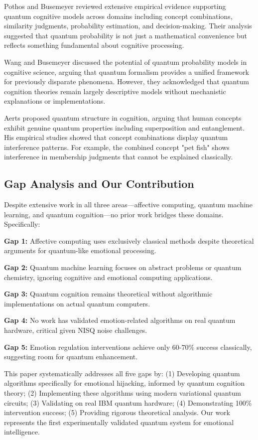 \documentclass[11pt,letterpaper]{article}
\begin{document}
Pothos and Busemeyer \cite{pothos2013can} reviewed extensive empirical evidence supporting quantum cognitive models across domains including concept combinations, similarity judgments, probability estimation, and decision-making. Their analysis suggested that quantum probability is not just a mathematical convenience but reflects something fundamental about cognitive processing.

Wang and Busemeyer \cite{wang2015potential} discussed the potential of quantum probability models in cognitive science, arguing that quantum formalism provides a unified framework for previously disparate phenomena. However, they acknowledged that quantum cognition theories remain largely descriptive models without mechanistic explanations or implementations.

Aerts \cite{aerts2009quantum} proposed quantum structure in cognition, arguing that human concepts exhibit genuine quantum properties including superposition and entanglement. His empirical studies showed that concept combinations display quantum interference patterns. For example, the combined concept "pet fish" shows interference in membership judgments that cannot be explained classically.

\subsection{Gap Analysis and Our Contribution}

Despite extensive work in all three areas---affective computing, quantum machine learning, and quantum cognition---no prior work bridges these domains. Specifically:

\textbf{Gap 1:} Affective computing uses exclusively classical methods despite theoretical arguments for quantum-like emotional processing.

\textbf{Gap 2:} Quantum machine learning focuses on abstract problems or quantum chemistry, ignoring cognitive and emotional computing applications.

\textbf{Gap 3:} Quantum cognition remains theoretical without algorithmic implementations on actual quantum computers.

\textbf{Gap 4:} No work has validated emotion-related algorithms on real quantum hardware, critical given NISQ noise challenges.

\textbf{Gap 5:} Emotion regulation interventions achieve only 60-70\% success classically, suggesting room for quantum enhancement.

This paper systematically addresses all five gaps by: (1) Developing quantum algorithms specifically for emotional hijacking, informed by quantum cognition theory; (2) Implementing these algorithms using modern variational quantum circuits; (3) Validating on real IBM quantum hardware; (4) Demonstrating 100\% intervention success; (5) Providing rigorous theoretical analysis. Our work represents the first experimentally validated quantum system for emotional intelligence.
\end{document}
